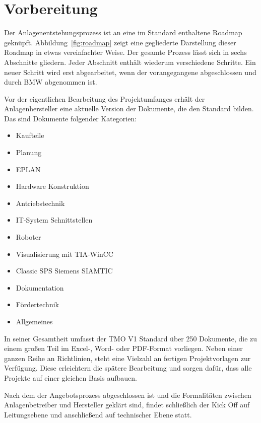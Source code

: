 


\section{Vorbereitung}

Der Anlagenentstehungsprozess ist an eine im Standard enthaltene Roadmap geknüpft. Abbildung~\ref{fig:roadmap} zeigt eine gegliederte Darstellung dieser Roadmap in etwas vereinfachter Weise. %
Der gesamte Prozess lässt sich in sechs Abschnitte gliedern. Jeder Abschnitt enthält wiederum verschiedene Schritte. Ein neuer Schritt wird erst abgearbeitet, wenn der vorangegangene abgeschlossen und durch BMW abgenommen ist.

Vor der eigentlichen Bearbeitung des Projektumfanges erhält der Anlagenhersteller eine aktuelle Version der Dokumente, die den Standard bilden. Das sind Dokumente folgender Kategorien:
  \begin{itemize}
    \itemsep0.1em
    \item Kaufteile
    \item Planung
    \item EPLAN
    \item Hardware Konstruktion
    \item Antriebstechnik
    \item IT-System Schnittstellen
    \item Roboter
    \item Visualisierung mit TIA-WinCC
    \item Classic SPS Siemens SIAMTIC
    \item Dokumentation
    \item Fördertechnik
    \item Allgemeines
  \end{itemize}

In seiner Gesamtheit umfasst der TMO V1 Standard über 250 Dokumente, die zu einem großen Teil im Excel-, Word- oder PDF-Format vorliegen. Neben einer ganzen Reihe an Richtlinien, steht eine Vielzahl an fertigen Projektvorlagen zur Verfügung. Diese erleichtern die spätere Bearbeitung und sorgen dafür, dass alle Projekte auf einer gleichen Basis aufbauen.

Nach dem der Angebotsprozess abgeschlossen ist und die Formalitäten zwischen Anlagenbetreiber und Hersteller geklärt sind, findet schließlich der Kick Off auf Leitungsebene und anschließend auf technischer Ebene statt.
